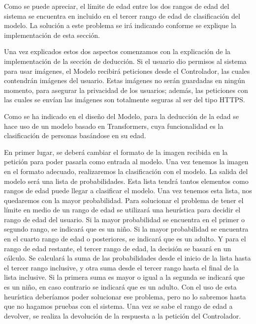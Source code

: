 Como se puede apreciar, el límite de edad entre los dos rangos de edad del sistema se encuentra en incluido en el tercer rango de edad de clasificación del modelo. La solución a este problema se irá indicando conforme se explique la implementación de esta sección.

Una vez explicados estos dos aspectos comenzamos con la explicación de la implementación de la sección de deducción. Si el usuario dio permisos al sistema para usar imágenes, el Modelo recibirá peticiones desde el Controlador, las cuales contendrán imágenes del usuario. Estas imágenes no serán guardadas en ningún momento, para asegurar la privacidad de los usuarios; además, las peticiones con las cuales se envían las imágenes son totalmente seguras al ser del tipo HTTPS.

Como se ha indicado en el diseño del Modelo, para la deducción de la edad se hace uso de un modelo basado en Transformers, cuya funcionalidad es la clasificación de personas basándose en su edad.

En primer lugar, se deberá cambiar el formato de la imagen recibida en la petición para poder pasarla como entrada al modelo. Una vez tenemos la imagen en el formato adecuado, realizaremos la clasificación con el modelo. La salida del modelo será una lista de probabilidades. Esta lista tendrá tantos elementos como rangos de edad puede llegar a clasificar el modelo. Una vez tenemos esta lista, nos quedaremos con la mayor probabilidad. Para solucionar el problema de tener el límite en medio de un rango de edad se utilizará una heurística para decidir el rango de edad del usuario. Si la mayor probabilidad se encuentra en el primer o segundo rango, se indicará que es un niño. Si la mayor probabilidad se encuentra en el cuarto rango de edad o posteriores, se indicará que es un adulto. Y para el rango de edad restante, el tercer rango de edad, la decisión se basará en un cálculo. Se calculará la suma de las probabilidades desde el inicio de la lista hasta el tercer rango inclusive, y otra suma desde el tercer rango hasta el final de la lista inclusive. Si la primera suma es mayor o igual a la segunda se indicará que es un niño, en caso contrario se indicará que es un adulto. Con el uso de esta heurística deberíamos poder solucionar ese problema, pero no lo sabremos hasta que no hagamos pruebas con el sistema. Una vez se sabe el rango de edad a devolver, se realiza la devolución de la respuesta a la petición del Controlador.

